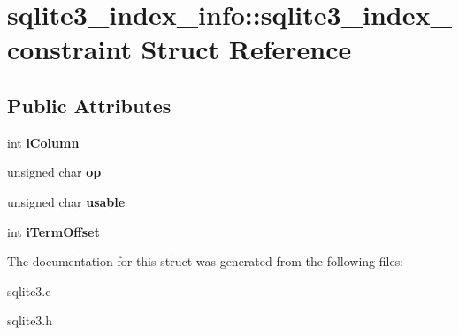 \hypertarget{structsqlite3__index__info_1_1sqlite3__index__constraint}{\section{sqlite3\-\_\-index\-\_\-info\-:\-:sqlite3\-\_\-index\-\_\-constraint Struct Reference}
\label{structsqlite3__index__info_1_1sqlite3__index__constraint}
}
\subsection*{Public Attributes}
\begin{DoxyCompactItemize}
\item 
\hypertarget{structsqlite3__index__info_1_1sqlite3__index__constraint_a0f1e207060420058ee2881f2ea368e3a}{int {\bfseries i\-Column}}\label{structsqlite3__index__info_1_1sqlite3__index__constraint_a0f1e207060420058ee2881f2ea368e3a}

\item 
\hypertarget{structsqlite3__index__info_1_1sqlite3__index__constraint_a362f4ec1f71975cb0ac39a8b5e4b1476}{unsigned char {\bfseries op}}\label{structsqlite3__index__info_1_1sqlite3__index__constraint_a362f4ec1f71975cb0ac39a8b5e4b1476}

\item 
\hypertarget{structsqlite3__index__info_1_1sqlite3__index__constraint_ae16e62caeab743cc68bb22227dacb501}{unsigned char {\bfseries usable}}\label{structsqlite3__index__info_1_1sqlite3__index__constraint_ae16e62caeab743cc68bb22227dacb501}

\item 
\hypertarget{structsqlite3__index__info_1_1sqlite3__index__constraint_a4e8368da66f34b7f07b369984b813d1b}{int {\bfseries i\-Term\-Offset}}\label{structsqlite3__index__info_1_1sqlite3__index__constraint_a4e8368da66f34b7f07b369984b813d1b}

\end{DoxyCompactItemize}


The documentation for this struct was generated from the following files\-:\begin{DoxyCompactItemize}
\item 
sqlite3.\-c\item 
sqlite3.\-h\end{DoxyCompactItemize}
